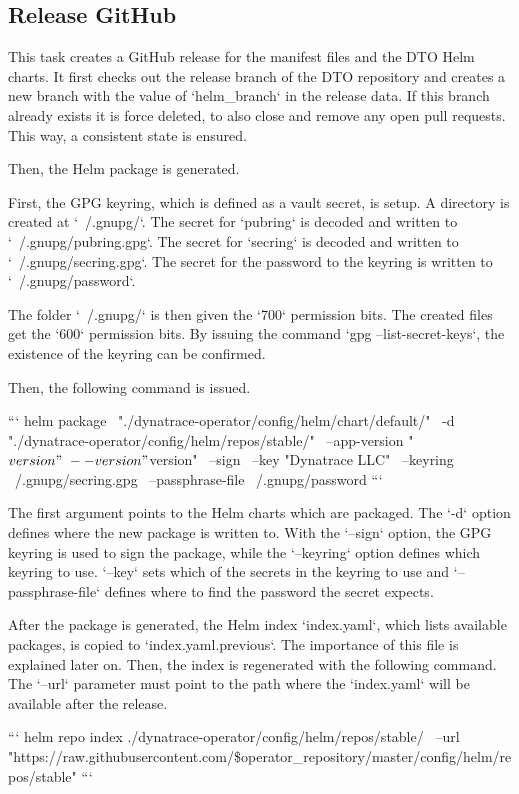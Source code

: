 \subsection{Release GitHub}\label{subsec:release-github}

This task creates a GitHub release for the manifest files and the DTO Helm charts.
It first checks out the release branch of the DTO repository and creates a new branch with the value of `helm_branch` in the release data.
If this branch already exists it is force deleted, to also close and remove any open pull requests.
This way, a consistent state is ensured.

Then, the Helm package is generated.

First, the GPG keyring, which is defined as a vault secret, is setup.
A directory is created at `~/.gnupg/`.
The secret for `pubring` is decoded and written to `~/.gnupg/pubring.gpg`.
The secret for `secring` is decoded and written to `~/.gnupg/secring.gpg`.
The secret for the password to the keyring is written to `~/.gnupg/password`.

The folder `~/.gnupg/` is then given the `700` permission bits.
The created files get the `600` permission bits.
By issuing the command `gpg --list-secret-keys`, the existence of the keyring can be confirmed.

Then, the following command is issued.

```
helm package \
"./dynatrace-operator/config/helm/chart/default/" \
-d "./dynatrace-operator/config/helm/repos/stable/" \
--app-version "${version}" \
--version "${version}" \
--sign \
--key "Dynatrace LLC" \
--keyring ~/.gnupg/secring.gpg \
--passphrase-file ~/.gnupg/password
```

The first argument points to the Helm charts which are packaged.
The `-d` option defines where the new package is written to.
With the `--sign` option, the GPG keyring is used to sign the package, while the `--keyring` option defines which keyring to use.
`--key` sets which of the secrets in the keyring to use and `--passphrase-file` defines where to find the password the secret expects.

After the package is generated, the Helm index `index.yaml`, which lists available packages, is copied to `index.yaml.previous`.
The importance of this file is explained later on.
Then, the index is regenerated with the following command.
The `--url` parameter must point to the path where the `index.yaml` will be available after the release.

```
helm repo index ./dynatrace-operator/config/helm/repos/stable/ \
--url "https://raw.githubusercontent.com/\${operator_repository}/master/config/helm/repos/stable"
```

